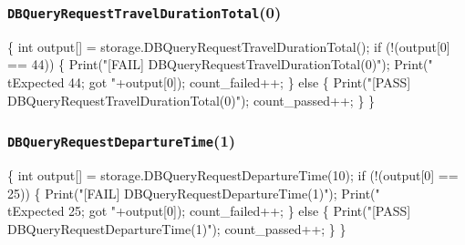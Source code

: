 \documentclass{article}
\def\nwendcode{\endtrivlist \endgroup}
\let\nwdocspar=\par
\begin{document}
\subsubsection{{\tt{}DBQueryRequestTravelDurationTotal}(0)}
\nwenddocs{}\endmoddef{}
\{
  int output[] = storage.DBQueryRequestTravelDurationTotal();
  if (!(output[0] == 44)) \{
    Print("[FAIL] DBQueryRequestTravelDurationTotal(0)");
    Print("\\tExpected 44; got "+output[0]);
    count_failed++;
  \} else \{
    Print("[PASS] DBQueryRequestTravelDurationTotal(0)");
    count_passed++;
  \}
\}
\nwendcode{}\nwdocspar
\subsubsection{{\tt{}DBQueryRequestDepartureTime}(1)}
\nwenddocs{}\endmoddef{}
\{
  int output[] = storage.DBQueryRequestDepartureTime(10);
  if (!(output[0] == 25)) \{
    Print("[FAIL] DBQueryRequestDepartureTime(1)");
    Print("\\tExpected 25; got "+output[0]);
    count_failed++;
  \} else \{
    Print("[PASS] DBQueryRequestDepartureTime(1)");
    count_passed++;
  \}
\}
\nwendcode{}\nwdocspar
\end{document}
